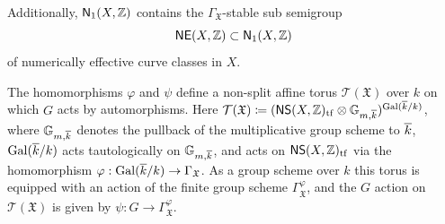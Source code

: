 \documentclass[twoside,leqno]{article}
\numberwithin{equation}{section}
\theoremstyle{plain}
\theoremstyle{definition}
\begin{document}
Additionally, $\mathsf{N}_{1}(X,\mathbb Z)$ contains the
$\Gamma_{\mathfrak{X}}$-stable sub semigroup
\[
\mathsf{NE}(X,\mathbb Z) \subset \mathsf{N}_{1}(X,\mathbb Z) 
\]
of numerically effective curve classes in $X$.

The homomorphisms $\varphi$ and $\psi$ define a non-split affine torus
$\mathcal{T}(\mathfrak{X})$ over $k$ on which $G$ acts by automorphisms.  Here
$\mathcal{T}(\mathfrak{X}) \coloneqq (\mathsf{NS}(X,\mathbb Z)_{\operatorname{tf}}\otimes
\mathbb{G}_{m,\overline{k}})^{\operatorname{Gal}(\overline{k}/k)}$, where $\mathbb{G}_{m,\overline{k}}$
denotes the pullback of the multiplicative group scheme to $\overline{k}$,
$\operatorname{Gal}(\overline{k}/k)$ acts tautologically on $\mathbb{G}_{m,\overline{k}}$, and
acts on $\mathsf{NS}(X,\mathbb Z)_{\operatorname{tf}}$ via the homomorphism $\varphi : \operatorname{Gal}(\overline{k}/k)
\to \Gamma_{\mathfrak{X}}$. As a group scheme over $k$ this torus is
equipped with an action of the finite group scheme
$\Gamma^{\varphi}_{\mathfrak{X}}$, and the $G$ action on $\mathcal{T}(\mathfrak{X})$
is given by $\psi : G \to \Gamma^{\varphi}_{\mathfrak{X}}$. 

\bigskip
\end{document}
